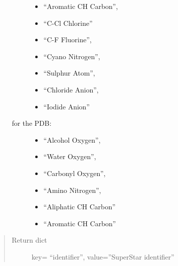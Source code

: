 \documentclass[letterpaper,10pt,english]{sphinxmanual}
\begin{document}
\begin{fulllineitems}
\begin{fulllineitems}
\begin{fulllineitems}
\begin{description}
\begin{description}
\begin{itemize}
\item {} 
“Aromatic CH Carbon”,

\item {} 
“C-Cl Chlorine”

\item {} 
“C-F Fluorine”,

\item {} 
“Cyano Nitrogen”,

\item {} 
“Sulphur Atom”,

\item {} 
“Chloride Anion”,

\item {} 
“Iodide Anion”

\end{itemize}

\item[{for the PDB:}] \leavevmode\begin{itemize}
\item {} 
“Alcohol Oxygen”,

\item {} 
“Water Oxygen”,

\item {} 
“Carbonyl Oxygen”,

\item {} 
“Amino Nitrogen”,

\item {} 
“Aliphatic CH Carbon”

\item {} 
“Aromatic CH Carbon”

\end{itemize}

\end{description}

\end{description}
\begin{quote}\begin{description}
\item[{Return dict}] \leavevmode
key= “identifier”, value=”SuperStar identifier”

\end{description}\end{quote}

\end{fulllineitems}


\end{fulllineitems}



\end{fulllineitems}
\end{document}
